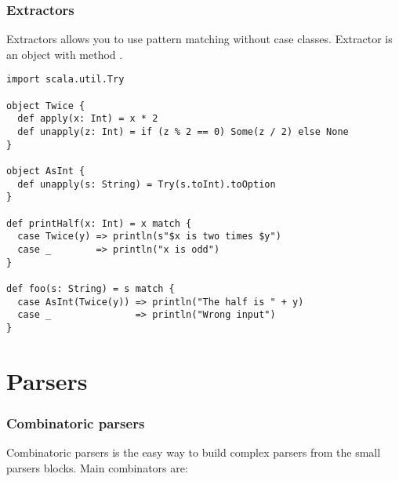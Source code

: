 \documentclass{beamer}
\begin{document}
\begin{frame}[fragile]
\frametitle{Extractors}

Extractors allows you to use pattern matching without case classes. Extractor is an object with
method .

\begin{example}
\begin{lstlisting}
import scala.util.Try

object Twice {
  def apply(x: Int) = x * 2
  def unapply(z: Int) = if (z % 2 == 0) Some(z / 2) else None
}

object AsInt {
  def unapply(s: String) = Try(s.toInt).toOption
}

def printHalf(x: Int) = x match {
  case Twice(y) => println(s"$x is two times $y")
  case _        => println("x is odd")
}

def foo(s: String) = s match {
  case AsInt(Twice(y)) => println("The half is " + y)
  case _               => println("Wrong input")
}
\end{lstlisting}
\end{example}
\end{frame}

\section{Parsers}

\begin{frame}[fragile]
\frametitle{Combinatoric parsers}
Combinatoric parsers is the easy way to build complex parsers from the small parsers blocks.
Main combinators are:
\end{frame}
\end{document}
